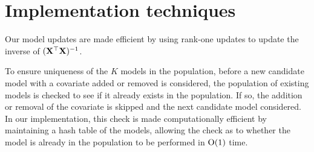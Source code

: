 \documentclass{amsart}[12pt]
\begin{document}
\section{Implementation techniques}
Our model updates are made efficient by using rank-one updates to update the inverse of $({\bf X}^\top {\bf X})^{-1}$.

To ensure uniqueness of the $K$ models in the population, before a new candidate model with a covariate added
or removed is considered, the population of existing models is checked to see if it already exists in the
population. If so, the addition or removal of the covariate is skipped and the next candidate model considered.
In our implementation, this check is made computationally efficient by maintaining a hash table of the models,
allowing the check as to whether the model is already in the population to be performed in $\text{O}(1)$ time.



\end{document}
